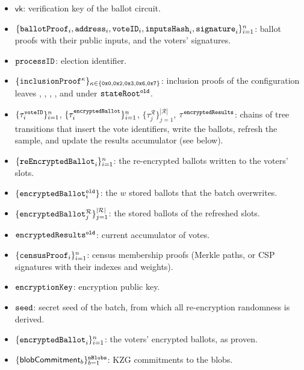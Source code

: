 	\begin{itemize}
		\item \private $\mathsf{vk}$: verification key of the ballot circuit.
		\item \private $\{\texttt{ballotProof}_i, \texttt{address}_i, \texttt{voteID}_i, \texttt{inputsHash}_i, \texttt{signature}_i\}_{i=1}^{n}$: ballot proofs with their public inputs, and the voters' signatures.\\
		\item \private $\texttt{processID}$: election identifier.
		\item \private $\{\texttt{inclusionProof}^{\kappa}\}_{\kappa \in \{\texttt{0x0}, \texttt{0x2}, \texttt{0x3}, \texttt{0x6}, \texttt{0x7}\}}$: inclusion proofs of the configuration leaves \processid, \ballotmode, \epk, \censusorigin, and \ballotvkhash under $\texttt{stateRoot}^\texttt{old}$.
		\item \private $\{\tau^{\texttt{voteID}}_i\}_{i=1}^{n}$, $\{\tau^{\texttt{encryptedBallot}}_i\}_{i=1}^{n}$, $\{\tau^{\mathcal{R}}_j\}_{j=1}^{|\mathcal{R}|}$, $\tau^{\texttt{encryptedResults}}$: chains of tree transitions that insert the vote identifiers, write the ballots, refresh the sample, and update the results accumulator (see below).
		\item \private $\{\texttt{reEncryptedBallot}_i\}_{i=1}^{n}$: the re-encrypted ballots written to the voters' slots.
		\item \private $\{\texttt{encryptedBallot}_i^\texttt{old}\}$: the $w$ stored ballots that the batch overwrites.
		\item \private $\{\texttt{encryptedBallot}^{\mathcal{R}}_j\}_{j=1}^{|\mathcal{R}|}$: the stored ballots of the refreshed slots.
		\item \private $\texttt{encryptedResults}^\texttt{old}$: current accumulator of votes. \\
		\item \private $\{\texttt{censusProof}_i\}_{i=1}^{n}$: census membership proofs (Merkle paths, or \ac{CSP} signatures with their indexes and weights).\\
		\item \private $\texttt{encryptionKey}$: encryption public key.
		\item \private $\texttt{seed}$: secret seed of the batch, from which all re-encryption randomness is derived.
		\item \private $\{\texttt{encryptedBallot}_i\}_{i=1}^{n}$: the voters' encrypted ballots, as proven.\\
		\item \private $\{{\sf{blobCommitment}}_b\}_{b=1}^{\texttt{nBlobs}}$: \ac{KZG} commitments to the blobs.
	\end{itemize}
